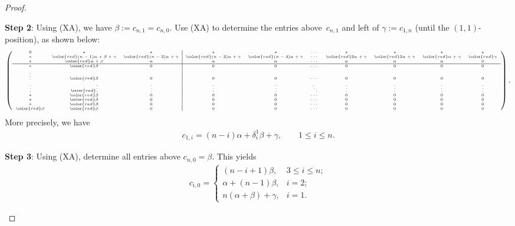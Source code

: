\documentclass[10pt,a4paper]{amsart}
\newcommand\rbeta{{\color{red}\beta}}
\newcommand\rgamma{{\color{red}\gamma}}
\numberwithin{equation}{section}
\begin{document}
\begin{proof}
\begin{itemize}
{\bf Step 2}: Using (XA), we have $\beta := c_{n,1} = c_{n,0}$. Use (XA) to determine the entries above~$c_{n,1}$ and left of $\gamma := c_{1,n}$ (until the $(1,1)$-position), as shown below:
\begin{align*}
\begin{tiny}
\left( \begin{array}{ccc|cccccccc}
0 & * & * & * & * & \cdots & * & * & * & *\\
* & {\color{red} (n-1)\alpha + \beta + \gamma} & {\color{red} (n-2)\alpha + \gamma} & {\color{red} (n-3)\alpha + \gamma} & {\color{red} (n-4)\alpha + \gamma} & \cdots & {\color{red} 3\alpha + \gamma} & {\color{red} 2\alpha + \gamma} & {\color{red} \alpha + \gamma} & \rgamma\\
* & {\color{red} \alpha + \beta} & \alpha & \alpha & \alpha & \cdots & \alpha & \alpha & \alpha & 0\\ \hline
* & \rbeta & 0 & 0 & 0 & \cdots & 0 & 0 & 0 & 0\\
\vdots & {\color{red} \beta} & 0 & 0 & 0 & \cdots & 0 & 0 & 0 & 0\\
\vdots & {\color{red} \vdots} & \vdots & \vdots & \vdots & \ddots & \vdots & \vdots & \vdots & \vdots\\
* & \rbeta & 0 & 0 & 0 & \cdots & 0 & 0 & 0 & 0\\
* & \rbeta & 0 & 0 & 0 & \cdots & 0 & 0 & 0 & 0\\
* & \rbeta & 0 & 0 & 0 & \cdots & 0 & 0 & 0 & 0\\
\rbeta & \rbeta & 0 & 0 & 0 & \cdots & 0 & 0 & 0 & 0
\end{array} \right).
\end{tiny}
\end{align*}
More precisely, we have
\begin{align} \label{E:c1i}
c_{1,i} =
(n-i)\alpha + \delta_i^1\beta + \gamma, \qquad 1 \leq i \leq n.
\end{align}
	
{\bf Step 3}: Using (XA), determine all entries above $c_{n,0} = \beta$. This yields
\begin{align}\label{E:ci0}
c_{i,0} = \begin{cases}
(n-i+1)\beta, & 3 \leq i \leq n;\\
\alpha + (n-1)\beta, & i=2;\\
n(\alpha + \beta) + \gamma, & i=1.
\end{cases}
\end{align}
	

\end{itemize}
\end{proof}
\end{document}
